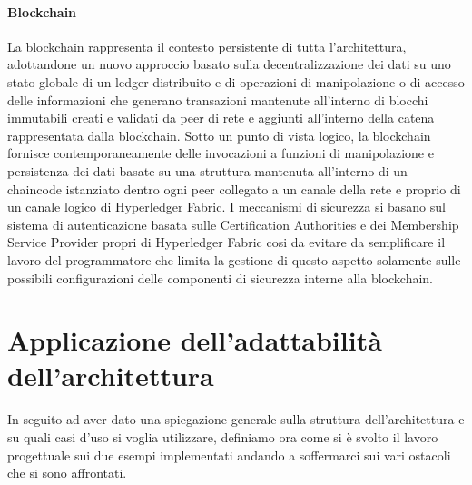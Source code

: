 \paragraph{Blockchain}
La blockchain rappresenta il contesto persistente di tutta l'architettura, adottandone un nuovo approccio basato sulla decentralizzazione dei dati su uno stato globale di un ledger distribuito e di operazioni di manipolazione o di accesso delle informazioni che generano transazioni mantenute all'interno di blocchi immutabili creati e validati da peer di rete e aggiunti all'interno della catena rappresentata dalla blockchain. 
Sotto un punto di vista logico, la blockchain fornisce contemporaneamente delle invocazioni a funzioni di manipolazione e persistenza dei dati basate su una struttura mantenuta all'interno di un chaincode istanziato dentro ogni peer collegato a un canale della rete e proprio di un canale logico di Hyperledger Fabric. I meccanismi di sicurezza si basano sul sistema di autenticazione basata sulle Certification Authorities e dei Membership Service Provider propri di Hyperledger Fabric cosi da evitare da semplificare il lavoro del programmatore che limita la gestione di questo aspetto solamente sulle possibili configurazioni delle componenti di sicurezza interne alla blockchain. 
\newpage
\section{Applicazione dell'adattabilità dell'architettura }
In seguito ad aver dato una spiegazione generale sulla struttura dell'architettura e su quali casi d'uso si voglia utilizzare, definiamo ora come si è svolto il lavoro progettuale sui due esempi implementati andando a soffermarci sui vari ostacoli che si sono affrontati.
